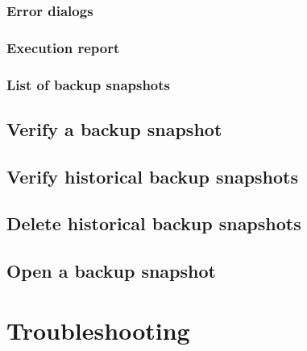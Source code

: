 \subsection{Error dialogs}
\subsection{Execution report}
\subsection{List of backup snapshots}
\section{Verify a backup snapshot}
\section{Verify historical backup snapshots}
\section{Delete historical backup snapshots}
\section{Open a backup snapshot}

\chapter{Troubleshooting}
